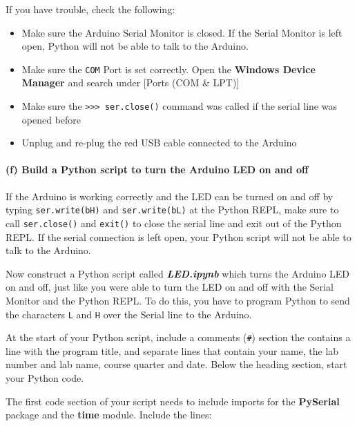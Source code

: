 If you have trouble, check the following:
\begin{itemize}
    \item Make sure the Arduino Serial
Monitor is closed. If the Serial Monitor is left open, Python will not
be able to talk to the Arduino. 
\item Make sure the
\texttt{\textquotesingle{}COM\textquotesingle{}} Port is set correctly.
Open the \textbf{Windows Device Manager} and search under {[}Ports (COM
\& LPT){]} 
\item Make sure the
\texttt{\textgreater{}\textgreater{}\textgreater{}\ ser.close()} command
was called if the serial line was opened before
\item Unplug and re-plug the
red USB cable connected to the Arduino
\end{itemize}

    \hypertarget{f-build-a-python-script-to-turn-the-arduino-led-on-and-off}{%
\paragraph{(f) Build a Python script to turn the Arduino LED on and
off}\label{f-build-a-python-script-to-turn-the-arduino-led-on-and-off}}

If the Arduino is working correctly and the LED can be turned on and off
by typing \texttt{ser.write(b\textquotesingle{}H\textquotesingle{})} and
\texttt{ser.write(b\textquotesingle{}L\textquotesingle{})} at the Python
REPL, make sure to call \texttt{ser.close()} and \texttt{exit()} to
close the serial line and exit out of the Python REPL. If the serial
connection is left open, your Python script will not be able to talk to
the Arduino.

Now construct a Python script called \textbf{\emph{LED.ipynb}} which
turns the Arduino LED on and off, just like you were able to turn the
LED on and off with the Serial Monitor and the Python REPL. To do this,
you have to program Python to send the characters \texttt{L} and
\texttt{H} over the Serial line to the Arduino.

At the start of your Python script, include a comments (\texttt{\#})
section the contains a line with the program title, and separate lines
that contain your name, the lab number and lab name, course quarter and
date. Below the heading section, start your Python code.

The first code section of your script needs to include imports for the
\textbf{PySerial} package and the \textbf{time} module. Include the
lines:

